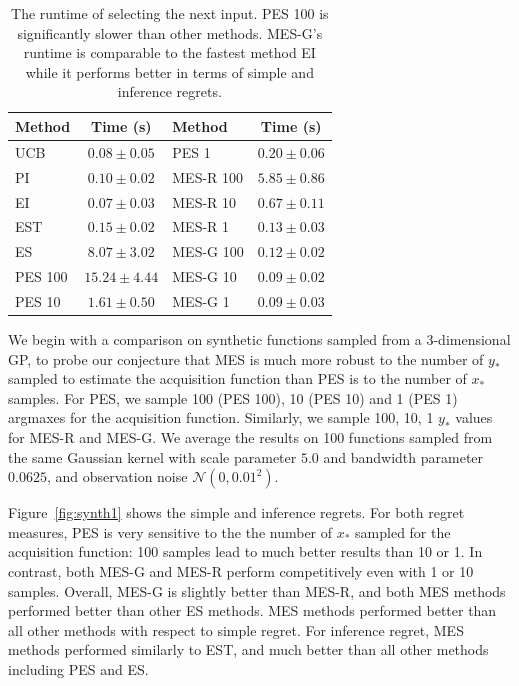 \begin{table}[t]
\caption{The runtime of selecting the next input. PES 100 is significantly slower than other methods. MES-G's runtime is comparable to the fastest method EI while it performs better in terms of simple and inference regrets.}
\label{tb:botiming}
\vskip -0.2in
\begin{center}
\begin{small}
\begin{sc}
\begin{tabular}{lc|lc}%
\hline
\abovespace\belowspace
Method & Time (s) & Method & Time (s) \\
\hline
\abovespace
UCB    & {\color{red}$0.08\pm0.05$}  & PES 1& $0.20\pm 0.06$ \\
PI & {\color{red}$0.10\pm0.02 $}        & MES-R 100& $5.85\pm 0.86 $\\
EI    & {\color{red}$0.07\pm 0.03$}             & MES-R 10 & $0.67\pm 0.11$ \\
EST    & $0.15\pm0.02$    & MES-R 1&  $0.13\pm 0.03$       \\
ES    & $8.07\pm3.02$      &  MES-G 100 & $0.12\pm 0.02$\\
PES 100   & $15.24\pm4.44$    & MES-G 10 & {\color{red}$0.09\pm0.02 $} \\
PES 10    & $1.61\pm 0.50$      & MES-G 1&    {\color{red}$0.09\pm0.03$}     \\
\hline
\end{tabular}
\end{sc}
\end{small}
\end{center}
\vskip -0.2in
\end{table}

We begin with a comparison on synthetic functions sampled from a 3-dimensional GP, to probe our conjecture that MES is much more robust to the number of $y_*$ sampled to estimate the acquisition function than PES is to the number of $x_*$ samples.
%
For PES, we sample 100 (PES 100), 10 (PES 10) and 1 (PES 1) argmaxes for the acquisition function. Similarly, we sample 100, 10, 1 $y_*$ values for MES-R and MES-G. We average the results on 100 functions sampled from the same Gaussian kernel with scale parameter $5.0$ and bandwidth parameter $0.0625$, and
%
observation noise $\mathcal{N}(0,0.01^2)$.

Figure~\ref{fig:synth1} shows the simple and inference regrets. 
For both regret measures, PES is very sensitive to the the number of $x_*$ sampled for the acquisition function: 100 samples lead to much better results than 10 or 1. In contrast, both MES-G and MES-R perform competitively even with 1 or 10 samples.
%
Overall, MES-G is slightly better than MES-R, and both MES methods performed better than other ES methods. 
MES methods performed better than all other methods with respect to simple regret. For inference regret, MES methods performed similarly to EST, and much better than all other methods including PES and ES. %

